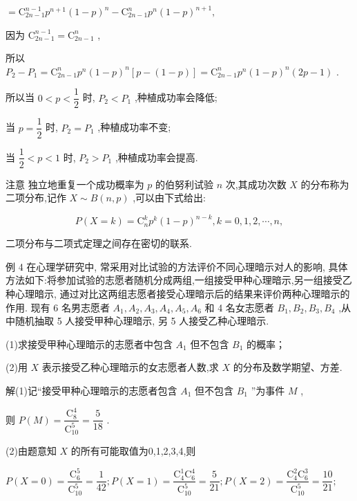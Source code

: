 $= {\mathrm{C}}_{{2n} - 1}^{n - 1}{p}^{n + 1}{\left( 1 - p\right) }^{n} - {\mathrm{C}}_{{2n} - 1}^{n}{p}^{n}{\left( 1 - p\right) }^{n + 1},$

因为 ${\mathrm{C}}_{{2n} - 1}^{n - 1} = {\mathrm{C}}_{{2n} - 1}^{n}$ ,

所以 ${P}_{2} - {P}_{1} = {\mathrm{C}}_{{2n} - 1}^{n}{p}^{n}{\left( 1 - p\right) }^{n}\left\lbrack  {p - \left( {1 - p}\right) }\right\rbrack   = {\mathrm{C}}_{{2n} - 1}^{n}{p}^{n}{\left( 1 - p\right) }^{n}\left( {{2p} - 1}\right)$ .

所以当 $0 < p < \dfrac{1}{2}$ 时, ${P}_{2} < {P}_{1}$ ,种植成功率会降低;

当 $p = \dfrac{1}{2}$ 时, ${P}_{2} = {P}_{1}$ ,种植成功率不变;

当 $\dfrac{1}{2} < p < 1$ 时, ${P}_{2} > {P}_{1}$ ,种植成功率会提高.

注意 独立地重复一个成功概率为 $p$ 的伯努利试验 $n$ 次,其成功次数 $X$ 的分布称为二项分布,记作 $X \sim  B\left( {n,p}\right)$ ,可以由下式给出:

\[
P\left( {X = k}\right)  = {\mathrm{C}}_{n}^{k}{p}^{k}{\left( 1 - p\right) }^{n - k},k = 0,1,2,\cdots ,n,
\]

二项分布与二项式定理之间存在密切的联系.

例 4 在心理学研究中, 常采用对比试验的方法评价不同心理暗示对人的影响, 具体方法如下:将参加试验的志愿者随机分成两组,一组接受甲种心理暗示,另一组接受乙种心理暗示, 通过对比这两组志愿者接受心理暗示后的结果来评价两种心理暗示的作用. 现有 6 名男志愿者 ${A}_{1},{A}_{2},{A}_{3},{A}_{4},{A}_{5},{A}_{6}$ 和 4 名女志愿者 ${B}_{1},{B}_{2},{B}_{3},{B}_{4}$ ,从中随机抽取 5 人接受甲种心理暗示, 另 5 人接受乙种心理暗示.

(1)求接受甲种心理暗示的志愿者中包含 ${A}_{1}$ 但不包含 ${B}_{1}$ 的概率；

(2)用 $X$ 表示接受乙种心理暗示的女志愿者人数,求 $X$ 的分布及数学期望、方差.

解(1)记“接受甲种心理暗示的志愿者包含 ${A}_{1}$ 但不包含 ${B}_{1}$ ”为事件 $M$ ,

则 $P\left( M\right)  = \dfrac{{\mathrm{C}}_{8}^{4}}{{\mathrm{C}}_{10}^{5}} = \dfrac{5}{18}$ .

(2)由题意知 $X$ 的所有可能取值为0,1,2,3,4,则

$P\left( {X = 0}\right)  = \dfrac{{\mathrm{C}}_{6}^{5}}{{\mathrm{C}}_{10}^{5}} = \dfrac{1}{42};P\left( {X = 1}\right)  = \dfrac{{\mathrm{C}}_{4}^{1}{\mathrm{C}}_{6}^{4}}{{\mathrm{C}}_{10}^{5}} = \dfrac{5}{21};P\left( {X = 2}\right)  = \dfrac{{\mathrm{C}}_{4}^{2}{\mathrm{C}}_{6}^{3}}{{\mathrm{C}}_{10}^{5}} = \dfrac{10}{21};$

